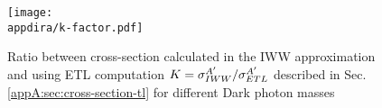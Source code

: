 \begin{figure}[bth!]
  \centering
  \texttt{[image: \\appdira/k-factor.pdf]}
  \caption{Ratio between cross-section calculated in the IWW approximation and using ETL computation $K = \sigma^{A'}_{IWW} / \sigma^{A'}_{ETL}$ described in Sec.\ref{appA:sec:cross-section-tl} for different Dark photon masses \cite{DMsimulation}}
  \label{fig:k-factor}
\end{figure}

